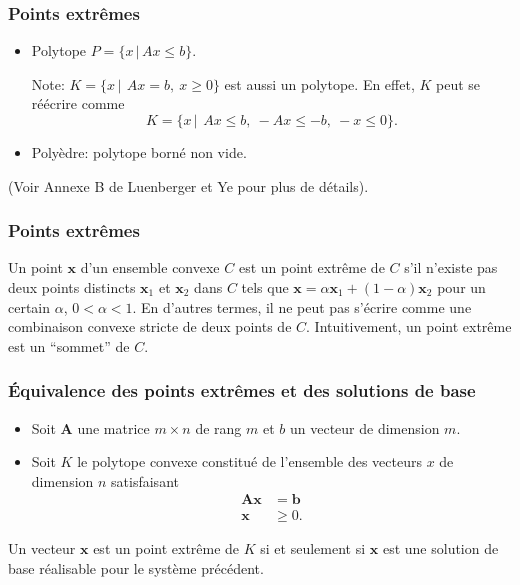 \documentclass[usepdftitle=false]{beamer}
\def\bb{\boldsymbol{b}}
\def\bx{\boldsymbol{x}}
\def\bA{\boldsymbol{A}}
\begin{document}
\begin{frame}
\frametitle{Points extrêmes}

\mbox{}

\begin{itemize}
\item
{\color{red}Polytope} $P = \lbrace x \,|\, Ax \leq b \rbrace$.

Note: $K = \lbrace x \,|\,\ Ax = b,\ x \geq 0 \rbrace$ est aussi un polytope. En effet, $K$ peut se réécrire comme
$$
K = \lbrace x \,|\,\ Ax \leq b,\ -Ax \leq -b,\ -x \leq 0 \rbrace.
$$
\item
{\color{red}Polyèdre}: polytope borné non vide.
\end{itemize}
\mbox{}

(Voir Annexe B de Luenberger et Ye pour plus de détails).



\end{frame}

\begin{frame}
\frametitle{Points extrêmes}

Un point $\bx$ d'un ensemble convexe $C$ est un {\color{red}point extrême} de $C$ s'il n'existe pas deux points distincts $\bx_1$ et $\bx_2$ dans $C$ tels que $\bx = \alpha \bx_1 + (1-\alpha) \bx_2$ pour un certain $\alpha$, $0 < \alpha < 1$.
En d'autres termes, il ne peut pas s'écrire comme une combinaison convexe stricte de deux points de $C$.
Intuitivement, un point extrême est un ``sommet'' de $C$.



\end{frame}

\begin{frame}
\frametitle{\'Equivalence des points extrêmes et des solutions de base}

\begin{itemize}
\item
Soit $\bA$ une matrice $m \times n$ de rang $m$ et $b$ un vecteur de dimension $m$.
\item
Soit $K$ le polytope convexe constitué de l'ensemble des vecteurs $x$ de dimension $n$ satisfaisant
\begin{align*}
\bA \bx &= \bb \\
\bx & \geq 0.
\end{align*}
\end{itemize}
Un vecteur $\bx$ est un point extrême de $K$ si et seulement si $\bx$ est une solution de base réalisable pour le système précédent.

\end{frame}
\end{document}
